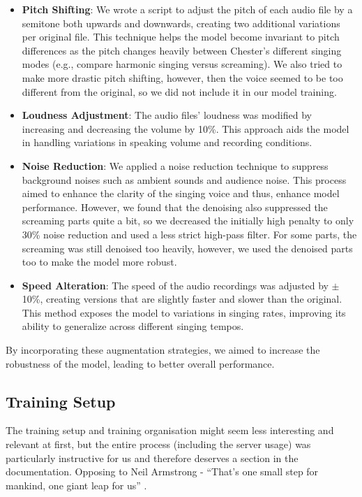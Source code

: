 \documentclass[a4paper]{article}
\begin{document}
	\begin{itemize}
		\item \textbf{Pitch Shifting}: We wrote a script to adjust the pitch of each audio file by a semitone both upwards and downwards, creating two additional variations per original file. This technique helps the model become invariant to pitch differences as the pitch changes heavily between Chester’s different singing modes (e.g., compare harmonic singing versus screaming). We also tried to make more drastic pitch shifting, however, then the voice seemed to be too different from the original, so we did not include it in our model training.
		
		\item \textbf{Loudness Adjustment}: The audio files’ loudness was modified by increasing and decreasing the volume by 10\%. This approach aids the model in handling variations in speaking volume and recording conditions.
		
		\item \textbf{Noise Reduction}: We applied a noise reduction technique to suppress background noises such as ambient sounds and audience noise. This process aimed to enhance the clarity of the singing voice and thus, enhance model performance. However, we found that the denoising also suppressed the screaming parts quite a bit, so we decreased the initially high penalty to only 30\% noise reduction and used a less strict high-pass filter. For some parts, the screaming was still denoised too heavily, however, we used the denoised parts too to make the model more robust.
		
		\item \textbf{Speed Alteration}: The speed of the audio recordings was adjusted by $\pm$10\%, creating versions that are slightly faster and slower than the original. This method exposes the model to variations in singing rates, improving its ability to generalize across different singing tempos.
	\end{itemize}
	
	By incorporating these augmentation strategies, we aimed to increase the robustness of the model, leading to better overall performance.
	
	\subsection{Training Setup}
	
	The training setup and training organisation might seem less interesting and relevant at first, but the entire process (including the server usage) was particularly instructive for us and therefore deserves a section in the documentation. Opposing to Neil Armstrong - “That’s one small step for mankind, one giant leap for us” .
	
\end{document}
